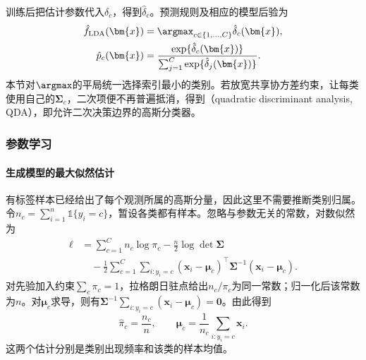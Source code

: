 训练后把估计参数代入$\delta_c$，得到$\hat{\delta}_c$。预测规则及相应的模型后验为
\begin{equation}
  \label{eq:classification-lda-prediction}
  \begin{aligned}
    \hat f_{\mathrm{LDA}}(\bm{x})
      &=\argmax_{c\in\{1,\ldots,C\}}\hat{\delta}_c(\bm{x}),\\
    \hat p_c(\bm{x})
      &=\frac{\exp\{\hat{\delta}_c(\bm{x})\}}
        {\sum_{j=1}^{C}\exp\{\hat{\delta}_j(\bm{x})\}} .
  \end{aligned}
\end{equation}
本节对$\argmax$的平局统一选择索引最小的类别。若放宽共享协方差约束，让每类使用自己的$\bm{\Sigma}_c$，二次项便不再普遍抵消，得到（quadratic discriminant analysis, QDA），即允许二次决策边界的高斯分类器。

\subsubsection{参数学习}
\label{sec:classification-lda-learning}

\paragraph{生成模型的最大似然估计}
有标签样本已经给出了每个观测所属的高斯分量，因此这里不需要推断类别归属。令$n_c=\sum_{i=1}^{n}\mathbb{1}\{y_i=c\}$，暂设各类都有样本。忽略与参数无关的常数，对数似然为
\begin{equation}
  \label{eq:classification-lda-likelihood}
  \begin{aligned}
    \ell
      &=\sum_{c=1}^{C}n_c\log\pi_c
        -\frac n2\log\det\bm{\Sigma}\\
      &\quad-\frac12\sum_{c=1}^{C}\sum_{i:y_i=c}
        (\bm{x}_i-\bm{\mu}_c)^{\top}
        \bm{\Sigma}^{-1}(\bm{x}_i-\bm{\mu}_c).
  \end{aligned}
\end{equation}
对先验加入约束$\sum_c\pi_c=1$，拉格朗日驻点给出$n_c/\pi_c$为同一常数；归一化后该常数为$n$。对$\bm{\mu}_c$求导，则有$\bm{\Sigma}^{-1}\sum_{i:y_i=c}(\bm{x}_i-\bm{\mu}_c)=\bm{0}$。由此得到
\begin{equation}
  \label{eq:classification-lda-mean-prior}
  \hat\pi_c=\frac{n_c}{n},\qquad
  \hat{\bm{\mu}}_c=\frac1{n_c}\sum_{i:y_i=c}\bm{x}_i .
\end{equation}
这两个估计分别是类别出现频率和该类的样本均值。


